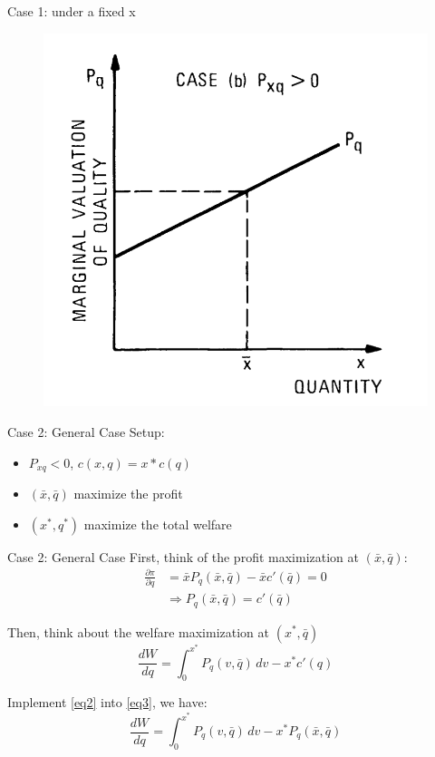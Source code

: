\documentclass[10pt]{beamer}
\begin{document}
\begin{frame}{Case 1: under a fixed x}
\begin{figure}
    \centering
    \includegraphics[width = .7\textwidth]{spence1.png}
    \label{fig:1}
\end{figure}
\end{frame}

\begin{frame}{Case 2: General Case}
Setup: 
\begin{itemize}
    \item $P_{xq}<0$, $c(x,q) = x*c(q)$ 
    \item $(\bar{x}, \bar{q})$ maximize the profit
    \item $(x^*,q^*)$ maximize the total welfare 
\end{itemize}  
\end{frame}

\begin{frame}{Case 2: General Case}
First, think of the profit maximization at $(\bar{x}, \bar{q})$:
\begin{equation}\label{eq2}
\begin{split}
\frac{\partial \pi}{\partial q} & = \bar{x} P_q(\bar{x},\bar{q}) - \bar{x}c'(\bar{q}) = 0\\
& \Rightarrow  P_q(\bar{x},\bar{q}) = c'(\bar{q})
\end{split}
\end{equation}

Then, think about the welfare maximization at $(x^*, \bar{q})$
\begin{equation}\label{eq3}
   \frac{d W}{d q}  = \int_{0}^{x^*} P_q(v,\bar{q})\,dv - x^* c'(q)
\end{equation}

Implement \ref{eq2} into \ref{eq3}, we have:
\begin{equation}
\frac{d W}{d q}  = \int_{0}^{x^*} P_q(v,\bar{q})\,dv - x^* P_q(\bar{x},\bar{q})
\end{equation}
\end{frame}
\end{document}
